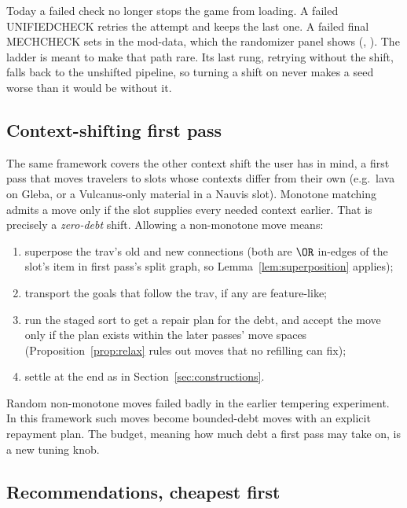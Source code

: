 Today a failed check no longer stops the game from loading. A failed UNIFIEDCHECK retries the attempt and keeps the last one. A failed final MECHCHECK sets  in the  mod-data, which the randomizer panel shows (, ). The ladder is meant to make that path rare. Its last rung, retrying without the shift, falls back to the unshifted pipeline, so turning a shift on never makes a seed worse than it would be without it.

\subsection{Context-shifting first pass}

The same framework covers the other context shift the user has in mind, a first pass that moves travelers to slots whose contexts differ from their own (e.g.\ lava on Gleba, or a Vulcanus-only material in a Nauvis slot). Monotone matching admits a move only if the slot supplies every needed context earlier. That is precisely a \emph{zero-debt} shift. Allowing a non-monotone move means:
\begin{enumerate}[nosep]
\item superpose the trav's old and new connections (both are $\OR$ in-edges of the slot's item in first pass's split graph, so Lemma~\ref{lem:superposition} applies);
\item transport the goals that follow the trav, if any are feature-like;
\item run the staged sort to get a repair plan for the debt, and accept the move only if the plan exists within the later passes' move spaces (Proposition~\ref{prop:relax} rules out moves that no refilling can fix);
\item settle at the end as in Section~\ref{sec:constructions}.
\end{enumerate}
Random non-monotone moves failed badly in the earlier tempering experiment. In this framework such moves become bounded-debt moves with an explicit repayment plan. The budget, meaning how much debt a first pass may take on, is a new tuning knob.

\subsection{Recommendations, cheapest first}

